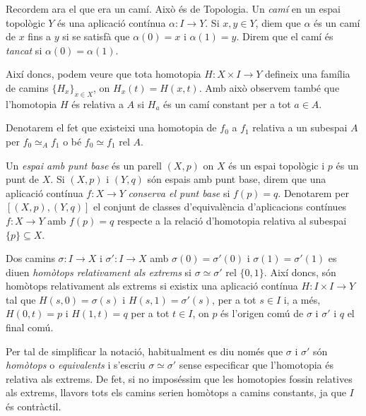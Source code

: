 \documentclass[../main.tex]{subfiles}
\begin{document}
Recordem ara el que era un camí. Això és de Topologia. Un \textit{camí} en un espai topològic $Y$ és una aplicació contínua $\alpha:I\rightarrow Y$. Si $x,y\in Y$, diem que $\alpha$ és un camí de $x$ fins a $y$ si se satisfà que $\alpha(0)= x$ i $\alpha(1) = y$. Direm que el camí és \textit{tancat} si $\alpha(0) = \alpha(1)$.

Així doncs, podem veure que tota homotopia $H:X\times I\longrightarrow Y$ defineix una família de camins $\{H_x\}_{x\in X}$, on $H_x(t) = H(x,t)$. Amb això observem també que l'homotopia $H$ és relativa a $A$ si $H_a$ és un camí constant per a tot $a\in A$.

Denotarem el fet que existeixi una homotopia de $f_0$ a $f_1$ relativa a un subespai $A$ per $f_0\simeq_A f_1$ o bé $f_0\simeq f_1$ rel $A$.

\begin{defi}
\label{def:espaiambpuntbase} Un \textit{espai amb punt base} és un parell $(X,p)$ on $X$ és un espai topològic i $p$ és un punt de $X$. Si $(X,p)$ i $(Y,q)$ són espais amb punt base, direm que una aplicació contínua $f:X\rightarrow Y$ \textit{conserva el punt base} si $f(p) = q$. Denotarem per $[(X,p),(Y,q)]$ el conjunt de classes d'equivalència d'aplicacions contínues $f:X\rightarrow Y$ amb $f(p)=q$ respecte a la relació d'homotopia relativa al subespai $\{p\}\subseteq X$.
\end{defi}

\begin{defi}
\label{def:homotopiadecamins} Dos camins $\sigma:I\rightarrow X$ i $\sigma':I\rightarrow X$ amb $\sigma(0) = \sigma'(0)$ i $\sigma(1)=\sigma'(1)$ es diuen \textit{homòtops relativament als extrems} si $\sigma\simeq \sigma'$ rel $\{0,1\}$. Així doncs, són homòtops relativament als extrems si existix una aplicació contínua $H:I\times I\rightarrow Y$ tal que $H(s,0)=\sigma(s)$ i $H(s,1) = \sigma'(s)$, per a tot $s\in I$ i, a més, $H(0,t) = p$ i $H(1,t) = q$ per a tot $t\in I$, on $p$ és l'origen comú de $\sigma$ i $\sigma'$ i $q$ el final comú.
\end{defi}

Per tal de simplificar la notació, habitualment es diu només que $\sigma$ i $\sigma'$ són \textit{homòtops} o \textit{equivalents} i s'escriu $\sigma\simeq\sigma'$ sense especificar que l'homotopia és relativa als extrems. De fet, si no imposéssim que les homotopies fossin relatives als extrems, llavors tots els camins serien homòtops a camins constants, ja que $I$ és contràctil.
\end{document}
